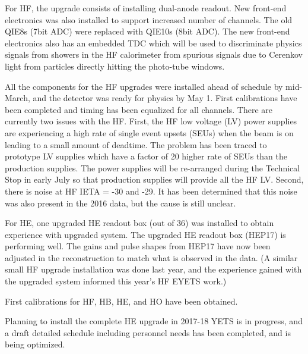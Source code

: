 For HF, the upgrade consists of installing
dual-anode readout. New 
front-end electronics was also installed to support increased number of channels.
The old QIE8s (7bit ADC) were replaced with QIE10s (8bit ADC).
The new front-end electronics also has an embedded TDC which will be used to discriminate 
physics signals from showers in the 
HF calorimeter from spurious signals due to Cerenkov light from particles directly hitting the photo-tube windows.

All the components for the HF upgrades were installed ahead of schedule by mid-March, and the detector was 
ready for physics by May 1. First calibrations have been completed and timing has been equalized for all channels.
There are currently two issues with the HF. First, the HF low voltage (LV) power supplies are experiencing a
high rate of single event upsets (SEUs) when the beam is on leading to a small amount of deadtime.
The problem has been traced to prototype LV supplies which have a factor of 20 higher rate of SEUs than
the production supplies. The power supplies will be re-arranged during the Technical Stop in early July
so that production supplies will provide all the HF LV. Second, there is noise at HF IETA = -30 and -29.
It has been determined that this noise was also present in the 2016 data, but the cause is still unclear.

\vspace*{2mm}

For HE, one upgraded HE readout box (out of 36) was installed
to obtain experience with upgraded system. The upgraded HE readout box (HEP17)
is performing well. The gains and pulse shapes from HEP17 have now been adjusted in the reconstruction
to match what is observed in the data. (A similar small HF upgrade installation was done
last year, and the experience gained with the upgraded system informed this year's HF EYETS work.)

\vspace*{2mm}

First calibrations for HF, HB, HE, and HO have been obtained. 

\vspace*{2mm}

Planning to install the complete HE upgrade in 2017-18 YETS is in progress, and a draft detailed schedule
including personnel needs has been completed, and is being optimized. 

\vspace*{3mm}

 \\

